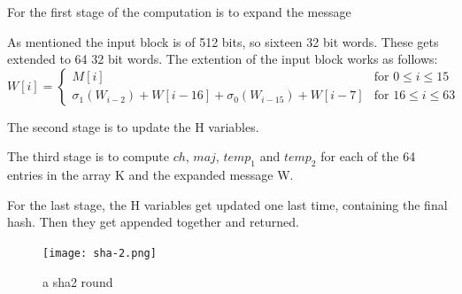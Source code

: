 \documentclass[a4paper, openany]{book}
\begin{document}
For the first stage of the computation is to expand the message

As mentioned the input block is of 512 bits, so sixteen 32 bit words. These gets extended to 64 32 bit words.
The extention of the input block works as follows:
\begin{equation}
  W[i] =
  \begin{cases}
    M[i]  &\text{for } 0 \leq i \leq 15\\
    \sigma_1(W_{i-2}) + W[i-16] + \sigma_0(W_{i-15}) + W[i-7] &\text{for } 16 \leq i \leq 63
  \end{cases}
\end{equation}

The second stage is to update the H variables.

The third stage is to compute \(ch\), \(maj\), \(temp_1\) and \(temp_2\) for each of the 64 entries in the array K and the expanded message W.

For the last stage, the H variables get updated one last time, containing the final hash. Then they get appended together and returned.

\begin{figure}[H]
\centering
\texttt{[image: sha-2.png]}
\caption{a sha2 round}
\label{fig:sha2round}
\end{figure}
\end{document}
